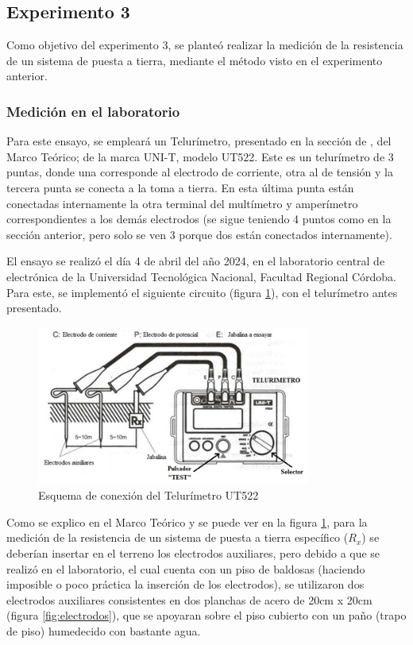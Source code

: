 \subsection{Experimento 3}

Como objetivo del experimento 3, se planteó realizar la medición de la resistencia de un sistema de puesta a tierra, mediante el método visto en el experimento anterior. 

\subsubsection{Medición en el laboratorio}

Para este ensayo, se empleará un Telurímetro, presentado en la sección de \textit{}, del Marco Teórico; de la marca UNI-T, modelo UT522. Este es un telurímetro de 3 puntas, donde una corresponde al electrodo de corriente, otra al de tensión y la tercera punta se conecta a la toma a tierra. En esta última punta están conectadas internamente la otra terminal del multímetro y amperímetro correspondientes a los demás electrodos (se sigue teniendo 4 puntos como en la sección anterior, pero solo se ven 3 porque dos están conectados internamente). 

El ensayo se realizó el día 4 de abril del año 2024, en el laboratorio central de electrónica de la Universidad Tecnológica Nacional, Facultad Regional Córdoba. Para este, se implementó el siguiente circuito (figura \ref{fig:circtel}), con el telurímetro antes presentado.

\begin{figure}[h!]
        \centering        
        \includegraphics[width=0.8\textwidth]{Imagenes/Telurimetro.png}
        \caption{Esquema de conexión del Telurímetro UT522}
        \label{fig:circtel}
\end{figure}

Como se explico en el Marco Teórico y se puede ver en la figura \ref{fig:circtel}, para la medición de la resistencia de un sistema de puesta a tierra específico ($R_x$) se deberían insertar en el terreno los electrodos auxiliares, pero debido a que se realizó en el laboratorio, el cual cuenta con un piso de baldosas (haciendo imposible o poco práctica la inserción de los electrodos), se utilizaron dos electrodos auxiliares consistentes en dos planchas de acero de 20cm x 20cm (figura \ref{fig:electrodos}), que se apoyaran sobre el piso cubierto con un paño (trapo de piso) humedecido con bastante agua. 

